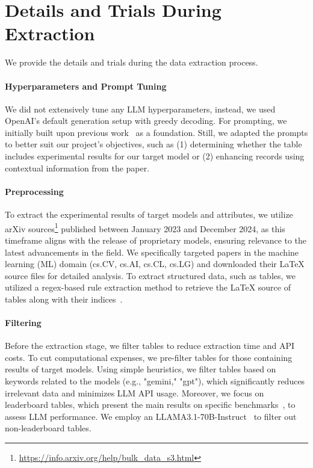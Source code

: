 \section{Details and Trials During Extraction}
\label{appendix:data_extraction}

We provide the details and trials during the data extraction process.

\paragraph{Hyperparameters and Prompt Tuning}

We did not extensively tune any LLM hyperparameters, instead, we used OpenAI’s default generation setup with greedy decoding.
For prompting, we initially built upon previous work~\citep{bai2023schema} as a foundation. 
Still, we adapted the prompts to better suit our project’s objectives, such as (1) determining whether the table includes experimental results for our target model or (2) enhancing records using contextual information from the paper. 


\paragraph{Preprocessing} To extract the experimental results of target models and attributes, we utilize arXiv sources\footnote{\url{https://info.arxiv.org/help/bulk_data_s3.html}} published between January 2023 and December 2024, as this timeframe aligns with the release of proprietary models, ensuring relevance to the latest advancements in the field. 
We specifically targeted papers in the machine learning (ML) domain (cs.CV, cs.AI, cs.CL, cs.LG) and downloaded their LaTeX source files for detailed analysis. 
To extract structured data, such as tables, we utilized a regex-based rule extraction method to retrieve the LaTeX source of tables along with their indices~\citep{bai2023schema}.


\paragraph{Filtering}

Before the extraction stage, we filter tables to reduce extraction time and API costs. 
To cut computational expenses, we pre-filter tables for those containing results of target models. 
Using simple heuristics, we filter tables based on keywords related to the models (e.g., "gemini," "gpt"), which significantly reduces irrelevant data and minimizes LLM API usage.
Moreover, we focus on leaderboard tables, which present the main results on specific benchmarks~\citep{kardas2020axcell}, to assess LLM performance. 
We employ an LLAMA3.1-70B-Instruct~\citep{dubey2024llama} to filter out non-leaderboard tables.


